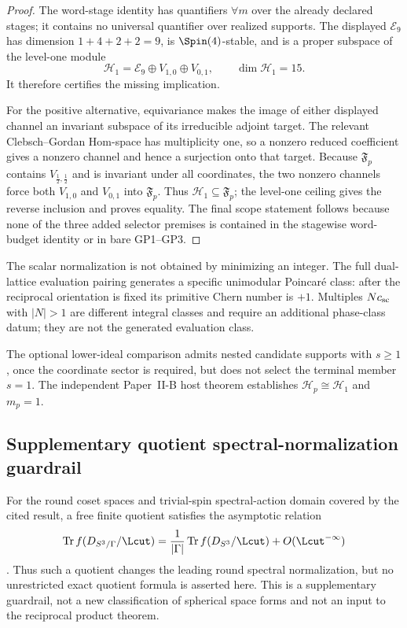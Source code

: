 \documentclass[11pt,a4paper]{article}
\begin{document}
\begin{proof}
The word-stage identity has quantifiers \(\forall m\) over the already
declared stages; it contains no universal quantifier over realized supports.
The displayed \(\mathcal E_9\) has dimension
\(1+4+2+2=9\), is \(\Spin(4)\)-stable, and is a proper subspace of the
level-one module
\[
 \mathcal H_1
 =\mathcal E_9\oplus V_{1,0}\oplus V_{0,1},
 \qquad \dim\mathcal H_1=15.
\]
It therefore certifies the missing implication.

For the positive alternative, equivariance makes the image of either
displayed channel an invariant subspace of its irreducible adjoint target.
The relevant Clebsch--Gordan Hom-space has multiplicity one, so a nonzero
reduced coefficient gives a nonzero channel and hence a surjection onto that
target.  Because \(\mathfrak F_p\) contains
\(V_{\frac12,\frac12}\) and is invariant under all coordinates, the two
nonzero channels force both \(V_{1,0}\) and \(V_{0,1}\) into
\(\mathfrak F_p\).  Thus \(\mathcal H_1\subseteq\mathfrak F_p\); the
level-one ceiling gives the reverse inclusion and proves equality.  The final
scope statement follows because none of the three added selector premises is
contained in the stagewise word-budget identity or in bare GP1--GP3.
\end{proof}


\begin{remark}
\label{p3:rem:scalar-primitivity-versus-vector-ceiling}
The scalar normalization is not obtained by minimizing an integer.  The full
dual-lattice evaluation pairing generates a specific unimodular Poincar\'e
class: after the reciprocal orientation is fixed its primitive Chern number is
\(+1\).  Multiples \(N c_{\rm sc}\) with \(|N|>1\) are different integral
classes and require an additional phase-class datum; they are not the
generated evaluation class.

The optional lower-ideal comparison admits nested candidate supports with \(s\ge1\), once the coordinate sector is required, but does not select the terminal member \(s=1\). The independent Paper~II-B host theorem establishes \(\mathcal H_p\cong\mathcal H_1\) and \(m_p=1\).
\end{remark}

\subsection{Supplementary quotient spectral-normalization guardrail}
\label{p3a:app:quotient-spectral-guardrail}
For the round coset spaces and trivial-spin spectral-action domain covered by
the cited result, a free finite quotient satisfies the asymptotic relation
\[
 \operatorname{Tr}f(D_{S^3/\Gamma}/\Lcut)
 =\frac{1}{|\Gamma|}
  \operatorname{Tr}f(D_{S^3}/\Lcut)
  +O(\Lcut^{-\infty})
\]
\cite{Teh2011}.  Thus such a quotient changes the leading round spectral
normalization, but no unrestricted exact quotient formula is asserted here.
This is a supplementary guardrail, not a new classification of spherical
space forms and not an input to the reciprocal product theorem.
\end{document}
